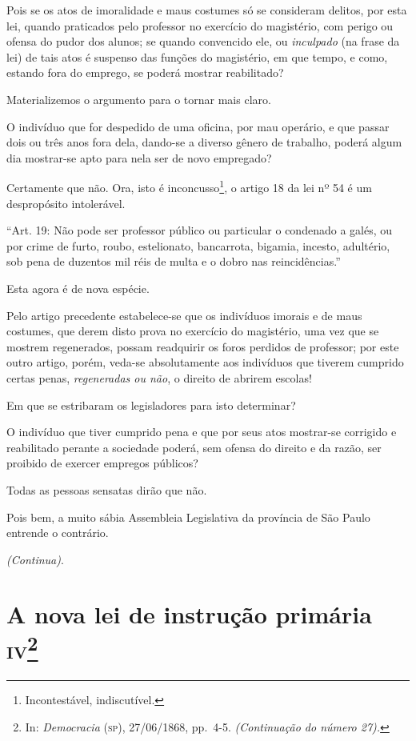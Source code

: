 Pois se os atos de imoralidade e maus costumes só se consideram delitos,
por esta lei, quando praticados pelo professor no exercício do
magistério, com perigo ou ofensa do pudor dos alunos; se quando
convencido ele, ou \emph{inculpado} (na frase da lei) de tais atos é
suspenso das funções do magistério, em que tempo, e como, estando fora
do emprego, se poderá mostrar reabilitado?

Materializemos o argumento para o tornar mais claro.

O indivíduo que for despedido de uma oficina, por mau operário, e que
passar dois ou três anos fora dela, dando-se a diverso gênero de
trabalho, poderá algum dia mostrar-se apto para nela ser de novo
empregado?

Certamente que não. Ora, isto é inconcusso\footnote{Incontestável,
  indiscutível.}, o artigo 18 da lei nº 54 é um despropósito
intolerável.

``Art. 19: Não pode ser professor público ou particular o condenado a
galés, ou por crime de furto, roubo, estelionato, bancarrota, bigamia,
incesto, adultério, sob pena de duzentos mil réis de multa e o dobro nas
reincidências.''

Esta agora é de nova espécie.

Pelo artigo precedente estabelece-se que os indivíduos imorais e de maus
costumes, que derem disto prova no exercício do magistério, uma vez que
se mostrem regenerados, possam readquirir os foros perdidos de
professor; por este outro artigo, porém, veda-se absolutamente aos
indivíduos que tiverem cumprido certas penas, \emph{regeneradas ou não},
o direito de abrirem escolas!

Em que se estribaram os legisladores para isto determinar?

O indivíduo que tiver cumprido pena e que por seus atos mostrar-se
corrigido e reabilitado perante a sociedade poderá, sem ofensa do
direito e da razão, ser proibido de exercer empregos públicos?

Todas as pessoas sensatas dirão que não.

Pois bem, a muito sábia Assembleia Legislativa da província de São Paulo
entrende o contrário.

\emph{(Continua)}.

\chapter{A nova lei de instrução primária \textsc{iv}\footnote{In:
  \emph{Democracia} (\textsc{sp}), 27/06/1868, pp.~4-5. \emph{(Continuação do
  número 27).}}}


